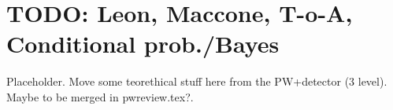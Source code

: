 \section{TODO: Leon, Maccone, T-o-A, Conditional prob./Bayes}

Placeholder. Move some teorethical stuff here from the PW+detector (3 level).
Maybe to be merged in pwreview.tex?.
